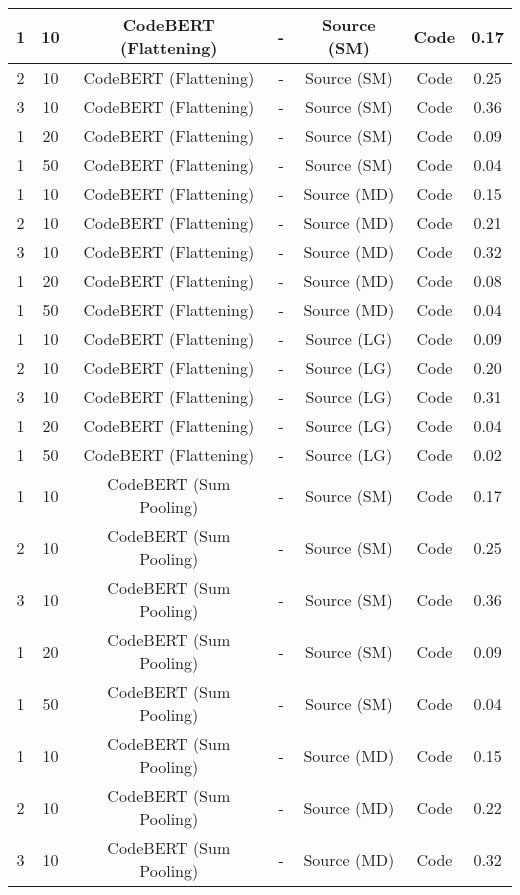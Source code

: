 \begin{longtable}{|c|c|c|c|c|c|c|}
\hline
1 & 10 & CodeBERT (Flattening) & - & Source (SM) & Code & 0.17 \\
\hline
2 & 10 & CodeBERT (Flattening) & - & Source (SM) & Code & 0.25 \\
\hline
3 & 10 & CodeBERT (Flattening) & - & Source (SM) & Code & 0.36 \\
\hline
1 & 20 & CodeBERT (Flattening) & - & Source (SM) & Code & 0.09 \\
\hline
1 & 50 & CodeBERT (Flattening) & - & Source (SM) & Code & 0.04 \\
\hline
1 & 10 & CodeBERT (Flattening) & - & Source (MD) & Code & 0.15 \\
\hline
2 & 10 & CodeBERT (Flattening) & - & Source (MD) & Code & 0.21 \\
\hline
3 & 10 & CodeBERT (Flattening) & - & Source (MD) & Code & 0.32 \\
\hline
1 & 20 & CodeBERT (Flattening) & - & Source (MD) & Code & 0.08 \\
\hline
1 & 50 & CodeBERT (Flattening) & - & Source (MD) & Code & 0.04 \\
\hline
1 & 10 & CodeBERT (Flattening) & - & Source (LG) & Code & 0.09 \\
\hline
2 & 10 & CodeBERT (Flattening) & - & Source (LG) & Code & 0.20 \\
\hline
3 & 10 & CodeBERT (Flattening) & - & Source (LG) & Code & 0.31 \\
\hline
1 & 20 & CodeBERT (Flattening) & - & Source (LG) & Code & 0.04 \\
\hline
1 & 50 & CodeBERT (Flattening) & - & Source (LG) & Code & 0.02 \\
\hline
1 & 10 & CodeBERT (Sum Pooling) & - & Source (SM) & Code & 0.17 \\
\hline
2 & 10 & CodeBERT (Sum Pooling) & - & Source (SM) & Code & 0.25 \\
\hline
3 & 10 & CodeBERT (Sum Pooling) & - & Source (SM) & Code & 0.36 \\
\hline
1 & 20 & CodeBERT (Sum Pooling) & - & Source (SM) & Code & 0.09 \\
\hline
1 & 50 & CodeBERT (Sum Pooling) & - & Source (SM) & Code & 0.04 \\
\hline
1 & 10 & CodeBERT (Sum Pooling) & - & Source (MD) & Code & 0.15 \\
\hline
2 & 10 & CodeBERT (Sum Pooling) & - & Source (MD) & Code & 0.22 \\
\hline
3 & 10 & CodeBERT (Sum Pooling) & - & Source (MD) & Code & 0.32 \\

\end{longtable}
